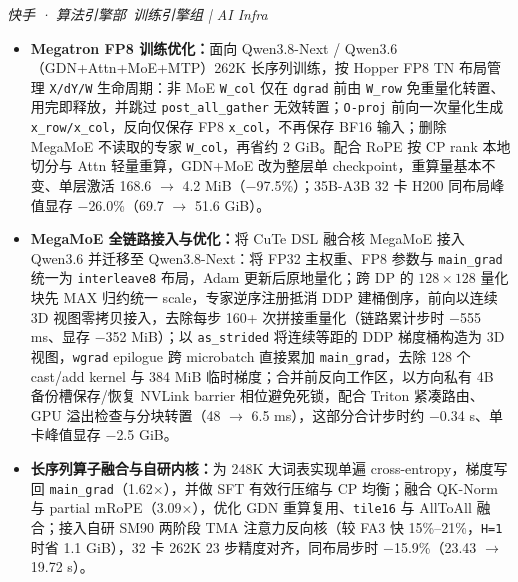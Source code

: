 \documentclass{resume}
\newcommand{\zh}[1]{#1}
\begin{document}
\zh{}
\zh{{\small\itshape 快手 · 算法引擎部\ 训练引擎组 | AI Infra}\par}
\begin{itemize}[parsep=0.25ex]
	\item \zh{\textbf{Megatron FP8 训练优化：}面向 Qwen3.8-Next / Qwen3.6（GDN+Attn+MoE+MTP）262K 长序列训练，按 Hopper FP8 TN 布局管理 \texttt{X/dY/W} 生命周期：非 MoE \texttt{W\_col} 仅在 \texttt{dgrad} 前由 \texttt{W\_row} 免重量化转置、用完即释放，并跳过 \texttt{post\_all\_gather} 无效转置；\texttt{O-proj} 前向一次量化生成 \texttt{x\_row/x\_col}，反向仅保存 FP8 \texttt{x\_col}，不再保存 BF16 输入；删除 MegaMoE 不读取的专家 \texttt{W\_col}，再省约 2 GiB。配合 RoPE 按 CP rank 本地切分与 Attn 轻量重算，GDN+MoE 改为整层单 checkpoint，重算量基本不变、单层激活 168.6 $\to$ 4.2 MiB（$-$97.5\%）；35B-A3B 32 卡 H200 同布局峰值显存 $-$26.0\%（69.7 $\to$ 51.6 GiB）。}
	\item \zh{\textbf{MegaMoE 全链路接入与优化：}将 CuTe DSL 融合核 MegaMoE 接入 Qwen3.6 并迁移至 Qwen3.8-Next：将 FP32 主权重、FP8 参数与 \texttt{main\_grad} 统一为 \texttt{interleave8} 布局，Adam 更新后原地量化；跨 DP 的 $128{\times}128$ 量化块先 MAX 归约统一 scale，专家逆序注册抵消 DDP 建桶倒序，前向以连续 3D 视图零拷贝接入，去除每步 160+ 次拼接重量化（链路累计步时 $-$555 ms、显存 $-$352 MiB）；以 \texttt{as\_strided} 将连续等距的 DDP 梯度桶构造为 3D 视图，\texttt{wgrad} epilogue 跨 microbatch 直接累加 \texttt{main\_grad}，去除 128 个 cast/add kernel 与 384 MiB 临时梯度；合并前反向工作区，以方向私有 4B 备份槽保存/恢复 NVLink barrier 相位避免死锁，配合 Triton 紧凑路由、GPU 溢出检查与分块转置（48 $\to$ 6.5 ms），这部分合计步时约 $-$0.34 s、单卡峰值显存 $-$2.5 GiB。}
	\item \zh{\textbf{长序列算子融合与自研内核：}为 248K 大词表实现单遍 cross-entropy，梯度写回 \texttt{main\_grad}（1.62$\times$），并做 SFT 有效行压缩与 CP 均衡；融合 QK-Norm 与 partial mRoPE（3.09$\times$），优化 GDN 重算复用、\texttt{tile16} 与 AllToAll 融合；接入自研 SM90 两阶段 TMA 注意力反向核（较 FA3 快 15\%--21\%，\texttt{H=1} 时省 1.1 GiB），32 卡 262K 23 步精度对齐，同布局步时 $-$15.9\%（23.43 $\to$ 19.72 s）。}
\end{itemize}
\end{document}
